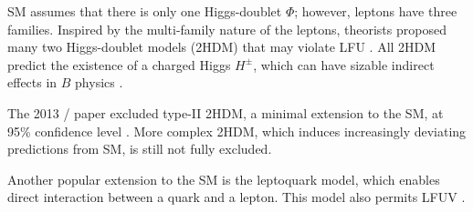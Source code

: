 SM assumes that there is only one Higgs-doublet $\Phi$; however, leptons have
three families.
Inspired by the multi-family nature of the leptons, theorists proposed many two
Higgs-doublet models (2HDM) that may violate LFU \cite{Branco:2011iw}.
All 2HDM predict the existence of a charged Higgs $H^{\pm}$, which can have
sizable indirect effects in $B$ physics \cite{Branco:2011iw}.

The 2013 \BaBar/ paper excluded type-II 2HDM, a minimal extension to the SM, at
95\% confidence level \cite{Lees:2013uzd}.
More complex 2HDM, which induces increasingly deviating predictions from SM, is
still not fully excluded.

Another popular extension to the SM is the leptoquark model, which enables
direct interaction between a quark and a lepton.
This model also permits LFUV \cite{Faber:2018afz}.
